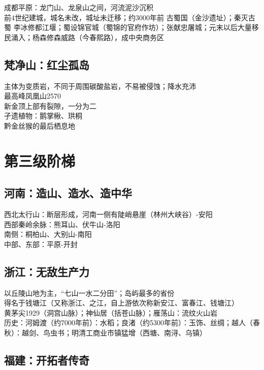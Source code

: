 成都平原：龙门山、龙泉山之间，河流泥沙沉积\\
前4世纪建城，城名未改，城址未迁移；约3000年前 古蜀国（金沙遗址）；秦灭古蜀 李冰修都江堰；蜀设锦官城（蜀锦的官府作坊）；张献忠屠城；元末以后大量移民涌入；杨森修森威路（今春熙路），成中央商务区

\subsection*{梵净山：红尘孤岛}

主体为变质岩，不同于周围碳酸盐岩，不易被侵蚀；降水充沛\\
最高峰凤凰山2570\\
新金顶上部有裂隙，一分为二\\
孑遗植物：鹅掌楸、珙桐\\
黔金丝猴的最后栖息地

\section{第三级阶梯}

\subsection*{河南：造山、造水、造中华}

西北太行山：断层形成，河南一侧有陡峭悬崖（林州大峡谷）-安阳\\
西部秦岭余脉：熊耳山、伏牛山-洛阳\\
南侧：桐柏山、大别山-南阳\\
中部、东部：平原-开封

\subsection*{浙江：无敌生产力}

以丘陵山地为主，“七山一水二分田”；岛屿最多的省份\\
得名于钱塘江（又称浙江、之江，自上游依次称新安江、富春江、钱塘江）\\
黄茅尖1929（洞宫山脉）；神仙居（括苍山脉）；雁荡山：流纹火山岩\\
历史：河姆渡（约7000年前）：水稻；良渚（约5300年前）：玉饰、丝绸；越人（春秋）：越剑、鸟虫书；明清工商业市镇猛增（西塘、南浔、乌镇）

\subsection*{福建：开拓者传奇}

